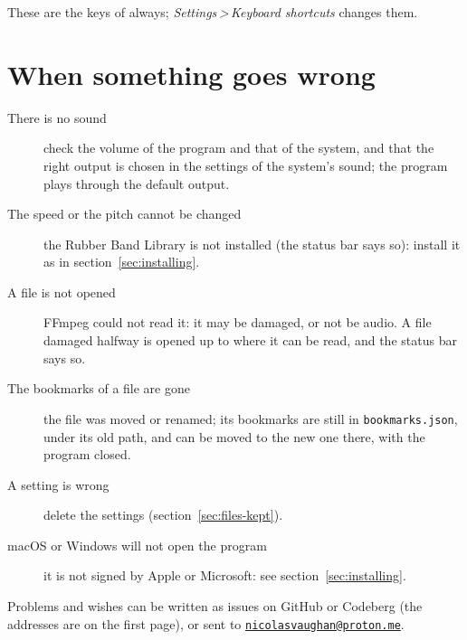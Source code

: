 \documentclass[12pt,
              article,
              oneside
              ]{memoir}
\newcommand*{\menu}[1]{\textit{#1}}
\newcommand*{\then}{\,>\,}
\begin{document}
\noindent These are the keys of always; \menu{Settings\then Keyboard
shortcuts} changes them.

\section{When something goes wrong}

%
\begin{description}
\item[There is no sound] check the volume of the program and that of the
  system, and that the right output is chosen in the settings of the
  system's sound; the program plays through the default output.
\item[The speed or the pitch cannot be changed] the Rubber Band Library is not
  installed (the status bar says so): install it as in
  section~\ref{sec:installing}.
\item[A file is not opened] FFmpeg could not read it: it may be damaged,
  or not be audio. A file damaged halfway is opened up to where it can be
  read, and the status bar says so.
\item[The bookmarks of a file are gone] the file was moved or renamed; its
  bookmarks are still in \texttt{bookmarks.json}, under its old path, and
  can be moved to the new one there, with the program closed.
\item[A setting is wrong] delete the settings
  (section~\ref{sec:files-kept}).
\item[macOS or Windows will not open the program] it is not signed by
  Apple or Microsoft: see section~\ref{sec:installing}.
\end{description}

\noindent
Problems and wishes can be written as issues on GitHub or
Codeberg (the addresses are on the first page), or sent to
\href{mailto:nicolasvaughan@proton.me}{\texttt{nicolasvaughan@proton.me}}.

\printindex
\end{document}
